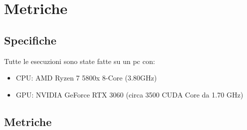 \documentclass[a4paper]{article}
\begin{document}
\newpage

\section{Metriche}

\subsection{Specifiche}

Tutte le esecuzioni sono state fatte su un pc con:
\begin{itemize}
    \item CPU: AMD Ryzen 7 5800x 8-Core (3.80GHz)
    \item GPU: NVIDIA GeForce RTX 3060 (circa 3500 CUDA Core da 1.70 GHz)
\end{itemize}

\subsection{Metriche}
\end{document}
